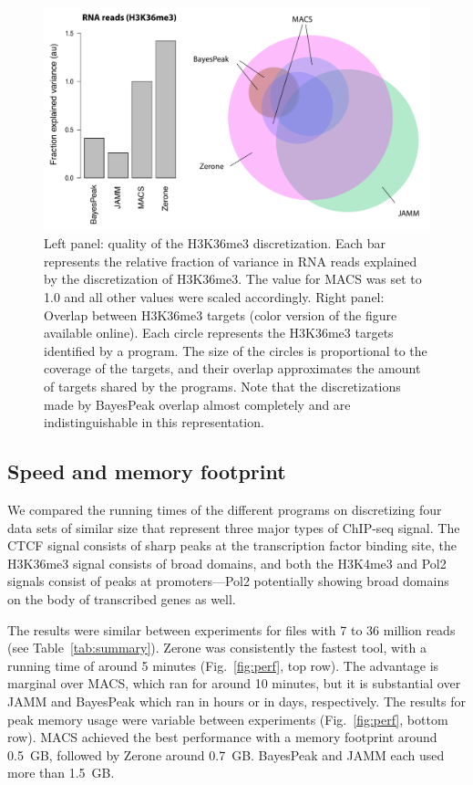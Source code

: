 \documentclass{bioinfo}
\begin{document}
\begin{figure}[!tpb]
\centerline{\includegraphics[scale=0.4]{histone_venn_color_names.pdf}}
\caption{
  Left panel: quality of the H3K36me3 discretization. Each bar
  represents the relative fraction of variance in RNA reads
  explained by the discretization of H3K36me3. The value for MACS was
  set to 1.0 and all other values were scaled accordingly. Right
  panel: Overlap between H3K36me3 targets (color version of the figure
  available online). Each circle represents the
  H3K36me3 targets identified by a program. The size of the circles
  is proportional to the coverage of the targets, and their overlap
  approximates the amount of targets shared by the programs. Note
  that the discretizations made by BayesPeak overlap almost completely and
  are indistinguishable in this representation.
}\label{fig:venn}
\end{figure}

\subsection{Speed and memory footprint}
We compared the running times of the different programs on discretizing
four data sets of similar size that represent three major types of
ChIP-seq signal. The CTCF signal consists of sharp
peaks at the transcription factor binding site, the H3K36me3 signal
consists of broad domains, and both the H3K4me3 and Pol2 signals consist
of peaks at promoters---Pol2 potentially showing broad domains on the
body of transcribed genes as well.

The results were similar between experiments for files with 7 to
36 million reads (see Table~\ref{tab:summary}). Zerone was
consistently the fastest tool, with a running time of around 5 minutes
(Fig.~\ref{fig:perf}, top row). The advantage is marginal over
MACS, which ran for around 10 minutes, but it is substantial over
JAMM and BayesPeak which ran in hours or in days, respectively.
The results for peak memory usage were variable between experiments
(Fig.~\ref{fig:perf},
bottom row). MACS achieved the best performance with a memory
footprint around 0.5~GB, followed by Zerone around 0.7~GB.
BayesPeak and JAMM each used more than 1.5~GB.
\end{document}
